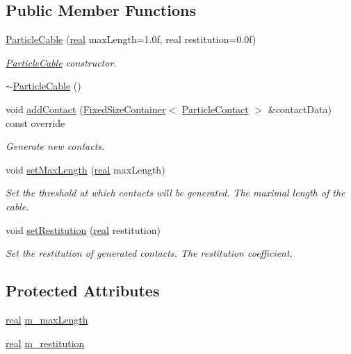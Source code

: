 \subsection*{Public Member Functions}
\begin{DoxyCompactItemize}
\item 
\mbox{\hyperlink{classr3_1_1_particle_cable_afcb568750f7430ec94e34942f766e087}{Particle\+Cable}} (\mbox{\hyperlink{namespacer3_ab2016b3e3f743fb735afce242f0dc1eb}{real}} max\+Length=1.\+0f, real restitution=0.\+0f)
\begin{DoxyCompactList}\small\item\em \mbox{\hyperlink{classr3_1_1_particle_cable}{Particle\+Cable}} constructor. \end{DoxyCompactList}\item 
\mbox{\hyperlink{classr3_1_1_particle_cable_a4ba107749641635a5d7b670eab78c371}{$\sim$\+Particle\+Cable}} ()
\item 
void \mbox{\hyperlink{classr3_1_1_particle_cable_a5187ee9d99fb41cf6e719c22c9b30a7c}{add\+Contact}} (\mbox{\hyperlink{classr3_1_1_fixed_size_container}{Fixed\+Size\+Container}}$<$ \mbox{\hyperlink{classr3_1_1_particle_contact}{Particle\+Contact}} $>$ \&contact\+Data) const override
\begin{DoxyCompactList}\small\item\em Generate new contacts. \end{DoxyCompactList}\item 
void \mbox{\hyperlink{classr3_1_1_particle_cable_a6cf3d6cff00fa5a7eeb1df8975cd59de}{set\+Max\+Length}} (\mbox{\hyperlink{namespacer3_ab2016b3e3f743fb735afce242f0dc1eb}{real}} max\+Length)
\begin{DoxyCompactList}\small\item\em Set the threshold at which contacts will be generated.  The maximal length of the cable. \end{DoxyCompactList}\item 
void \mbox{\hyperlink{classr3_1_1_particle_cable_a070f8df68fbf2b7a7b758f1c5b22c42c}{set\+Restitution}} (\mbox{\hyperlink{namespacer3_ab2016b3e3f743fb735afce242f0dc1eb}{real}} restitution)
\begin{DoxyCompactList}\small\item\em Set the restitution of generated contacts.  The restitution coefficient. \end{DoxyCompactList}\end{DoxyCompactItemize}
\subsection*{Protected Attributes}
\begin{DoxyCompactItemize}
\item 
\mbox{\hyperlink{namespacer3_ab2016b3e3f743fb735afce242f0dc1eb}{real}} \mbox{\hyperlink{classr3_1_1_particle_cable_a168d7ed5047dc94ae73f7eec4929ab4d}{m\+\_\+max\+Length}}
\item 
\mbox{\hyperlink{namespacer3_ab2016b3e3f743fb735afce242f0dc1eb}{real}} \mbox{\hyperlink{classr3_1_1_particle_cable_ad03466bf1aeecddec5fd0319be7b2e3d}{m\+\_\+restitution}}
\end{DoxyCompactItemize}
